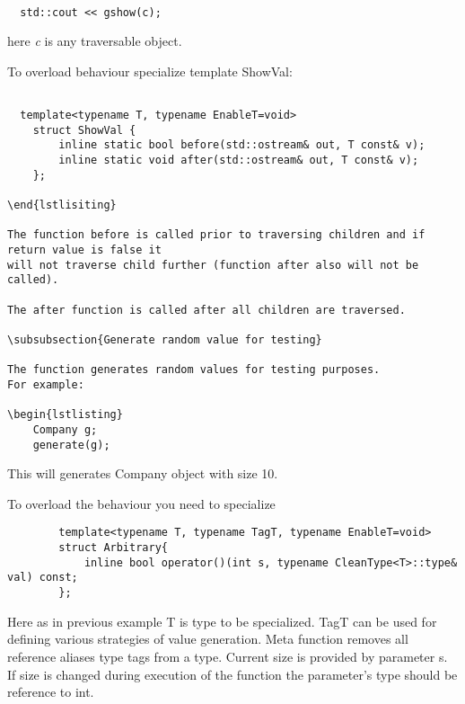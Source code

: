 \documentclass[a4paper]{article}
\begin{document}
\begin{lstlisting}

  std::cout << gshow(c);

\end{lstlisting}

here \emph{c} is any traversable object.

To overload behaviour specialize template ShowVal:

\begin{lstlisting}

  template<typename T, typename EnableT=void>
	struct ShowVal {
		inline static bool before(std::ostream& out, T const& v);
		inline static void after(std::ostream& out, T const& v);
	};

\end{lstlisiting}

The function before is called prior to traversing children and if return value is false it 
will not traverse child further (function after also will not be called). 

The after function is called after all children are traversed.

\subsubsection{Generate random value for testing}

The function generates random values for testing purposes.
For example:

\begin{lstlisting}
	Company g;
	generate(g);
\end{lstlisting}

This will generates Company object with size 10. 

To overload the behaviour you need to specialize 

\begin{lstlisting}
		template<typename T, typename TagT, typename EnableT=void>
		struct Arbitrary{
			inline bool operator()(int s, typename CleanType<T>::type& val) const;
		};
\end{lstlisting}

Here as in previous example T is type to be specialized. TagT can be used for defining
various strategies of value generation. Meta function removes all reference aliases type
tags from a type. Current size is provided by parameter s. If size is changed during 
execution of the function the parameter's type should be reference to int.
\end{document}
